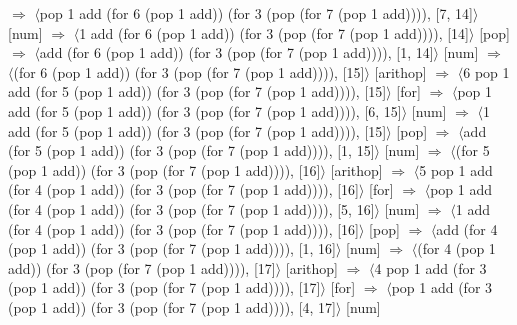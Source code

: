 \documentclass[12pt]{report}
\begin{document}
$\Rightarrow$ $\langle$pop 1 add (for 6 (pop 1 add)) (for 3 (pop (for 7 (pop 1 add)))), [7, 14]$\rangle$ \hfill [num] \newline
$\Rightarrow$ $\langle$1 add (for 6 (pop 1 add)) (for 3 (pop (for 7 (pop 1 add)))), [14]$\rangle$ \hfill [pop] \newline
$\Rightarrow$ $\langle$add (for 6 (pop 1 add)) (for 3 (pop (for 7 (pop 1 add)))), [1, 14]$\rangle$ \hfill [num] \newline
$\Rightarrow$ $\langle$(for 6 (pop 1 add)) (for 3 (pop (for 7 (pop 1 add)))), [15]$\rangle$ \hfill [arithop] \newline
$\Rightarrow$ $\langle$6 pop 1 add (for 5 (pop 1 add)) (for 3 (pop (for 7 (pop 1 add)))), [15]$\rangle$ \hfill [for] \newline
$\Rightarrow$ $\langle$pop 1 add (for 5 (pop 1 add)) (for 3 (pop (for 7 (pop 1 add)))), [6, 15]$\rangle$ \hfill [num] \newline
$\Rightarrow$ $\langle$1 add (for 5 (pop 1 add)) (for 3 (pop (for 7 (pop 1 add)))), [15]$\rangle$ \hfill [pop] \newline
$\Rightarrow$ $\langle$add (for 5 (pop 1 add)) (for 3 (pop (for 7 (pop 1 add)))), [1, 15]$\rangle$ \hfill [num] \newline
$\Rightarrow$ $\langle$(for 5 (pop 1 add)) (for 3 (pop (for 7 (pop 1 add)))), [16]$\rangle$ \hfill [arithop] \newline
$\Rightarrow$ $\langle$5 pop 1 add (for 4 (pop 1 add)) (for 3 (pop (for 7 (pop 1 add)))), [16]$\rangle$ \hfill [for] \newline
$\Rightarrow$ $\langle$pop 1 add (for 4 (pop 1 add)) (for 3 (pop (for 7 (pop 1 add)))), [5, 16]$\rangle$ \hfill [num] \newline
$\Rightarrow$ $\langle$1 add (for 4 (pop 1 add)) (for 3 (pop (for 7 (pop 1 add)))), [16]$\rangle$ \hfill [pop] \newline
$\Rightarrow$ $\langle$add (for 4 (pop 1 add)) (for 3 (pop (for 7 (pop 1 add)))), [1, 16]$\rangle$ \hfill [num] \newline
$\Rightarrow$ $\langle$(for 4 (pop 1 add)) (for 3 (pop (for 7 (pop 1 add)))), [17]$\rangle$ \hfill [arithop] \newline
$\Rightarrow$ $\langle$4 pop 1 add (for 3 (pop 1 add)) (for 3 (pop (for 7 (pop 1 add)))), [17]$\rangle$ \hfill [for] \newline
$\Rightarrow$ $\langle$pop 1 add (for 3 (pop 1 add)) (for 3 (pop (for 7 (pop 1 add)))), [4, 17]$\rangle$ \hfill [num] \newline
\end{document}
